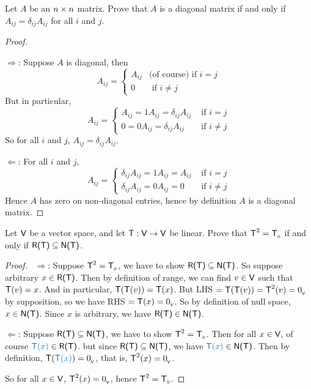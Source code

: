 \begin{exercise} \label{exercise 2.3.10}
Let \(A\) be an \(n \times n\) matrix.
Prove that \(A\) is a diagonal matrix if and only if \(A_{ij} = \delta_{ij} A_{ij}\) for all \(i\) and \(j\).
\end{exercise}

\begin{proof} \ 

\(\Longrightarrow\):
Suppose \(A\) is diagonal, then
\begin{equation*}
    A_{ij} = \begin{cases}
        A_{ij} & \text{(of course) if } i = j \\
        0 & \text{ if } i \ne j
    \end{cases}
\end{equation*}
But in particular,
\begin{equation*}
    A_{ij} = \begin{cases}
        A_{ij} = 1 A_{ij} = \delta_{ij} A_{ij} & \text{ if } i = j \\
        0 = 0 A_{ij} = \delta_{ij} A_{ij} & \text{ if } i \ne j
    \end{cases}
\end{equation*}
So for all \(i\) and \(j\), \(A_{ij} = \delta_{ij} A_{ij}\).

\(\Longleftarrow\):
For all \(i\) and \(j\),
\begin{equation*}
    A_{ij} = \begin{cases}
        \delta_{ij} A_{ij} = 1 A_{ij} = A_{ij} & \text{ if } i = j \\
        \delta_{ij} A_{ij} = 0 A_{ij} = 0 & \text{ if } i \ne j
    \end{cases}
\end{equation*}
Hence \(A\) has zero on non-diagonal entries, hence by definition \(A\) is a diagonal matrix.
\end{proof}

\begin{exercise} \label{exercise 2.3.11}
Let \(\textsf{V}\) be a vector space, and let \(\textsf{T} : \textsf{V} \to \textsf{V}\) be linear.
Prove that \(\textsf{T}^2 = \textsf{T}_{_0}\) if and only if \(\textsf{R(T)} \subseteq \textsf{N(T)}\).
\end{exercise}

\begin{proof} \ 
\(\Longrightarrow\): Suppose \(\textsf{T}^2 = \textsf{T}_{_0}\), we have to show \(\textsf{R(T)} \subseteq \textsf{N(T)}\).
So suppose arbitrary \(x \in \textsf{R(T)}\).
Then by definition of range, we can find \(v \in \textsf{V}\) such that \(\textsf{T}(v) = x\).
And in particular, \(\textsf{T}(\textsf{T}(v)) = \textsf{T}(x)\).
But LHS \(= \textsf{T}(\textsf{T}(v)) = \textsf{T}^2(v) = 0_{_{\textsf{V}}}\) by supposition, so we have RHS \(= \textsf{T}(x) = 0_{_{\textsf{V}}}\).
So by definition of null space, \(x \in \textsf{N(T)}\).
Since \(x\) is arbitrary, we have \(\textsf{R(T)} \in \textsf{N(T)}\).

\(\Longleftarrow\): Suppose \(\textsf{R(T)} \subseteq \textsf{N(T)}\), we have to show \(\textsf{T}^2 = \textsf{T}_{_0}\).
Then for all \(x \in \textsf{V}\), of course \(\BLUE{\T(x)} \in \RANGET\). but since \(\textsf{R(T)} \subseteq \textsf{N(T)}\), we have \(\BLUE{\T(x)} \in \NULLT\).
Then by definition, \(\T(\BLUE{\T(x)}) = \OV\), that is, \(\textsf{T}^2(x) = 0_{_{\textsf{V}}}\).

So for all \(x \in \textsf{V}\), \(\textsf{T}^2(x) = 0_{_{\textsf{V}}}\), hence \(\textsf{T}^2 = \textsf{T}_{_0}\).
\end{proof}

